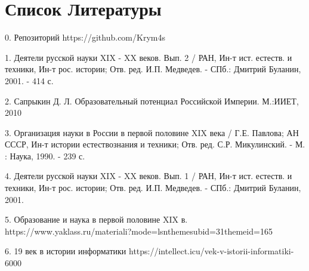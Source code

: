 \documentclass[a4paper,12pt]{article}
\begin{document}
\section{Список Литературы}

0. Репозиторий https://github.com/Krym4s

1. Деятели русской науки XIX - XX веков. Вып. 2 / РАН, Ин-т ист. естеств. и техники, Ин-т рос. истории; Отв. ред. И.П. Медведев. - СПб.: Дмитрий Буланин, 2001. - 414 с.

2. Сапрыкин Д. Л. Образовательный потенциал Российской Империи. М.:ИИЕТ, 2010

3. Организация науки в России в первой половине XIX века / Г.Е. Павлова; АН СССР, Ин-т истории естествознания и техники; Отв. ред. С.Р. Микулинский. - М. : Наука, 1990. - 239 с.

4. Деятели русской науки XIX - XX веков. Вып. 1 / РАН, Ин-т ист. естеств. и техники, Ин-т рос. истории; Отв. ред. И.П. Медведев. - СПб.: Дмитрий Буланин, 2001.

5. Образование и наука в первой половине XIX в. https://www.yaklass.ru/materiali?mode=lsnthemesubid=31themeid=165

6. 19 век в истории информатики https://intellect.icu/vek-v-istorii-informatiki-  6000
\end{document}

